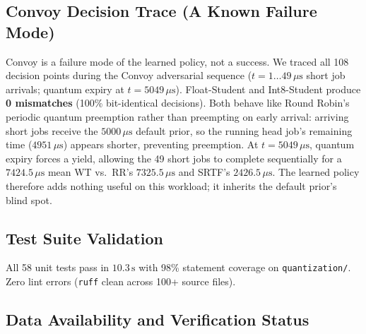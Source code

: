 \subsection{Convoy Decision Trace (A Known Failure Mode)}
\label{subsec:convoy}

Convoy is a failure mode of the learned policy, not a success. We traced all
108 decision points during the Convoy adversarial sequence
($t = 1\ldots 49\,\mu\text{s}$ short job arrivals; quantum expiry at
$t = 5049\,\mu\text{s}$). Float-Student and Int8-Student produce \textbf{0
mismatches} (100\% bit-identical decisions). Both behave like Round Robin's
periodic quantum preemption rather than preempting on early arrival: arriving
short jobs receive the $5000\,\mu\text{s}$ default prior, so the running head
job's remaining time ($4951\,\mu\text{s}$) appears shorter, preventing
preemption. At $t = 5049\,\mu\text{s}$, quantum expiry forces a yield, allowing
the 49 short jobs to complete sequentially for a $7424.5\,\mu\text{s}$ mean WT
vs.\ RR's $7325.5\,\mu\text{s}$ and SRTF's $2426.5\,\mu\text{s}$. The learned
policy therefore adds nothing useful on this workload; it inherits the default
prior's blind spot.

\subsection{Test Suite Validation}
\label{subsec:tests}

All 58 unit tests pass in $10.3\,\text{s}$ with 98\% statement coverage on
\texttt{quantization/}. Zero lint errors (\texttt{ruff} clean across 100+
source files).

\subsection{Data Availability and Verification Status}
\label{subsec:data}

